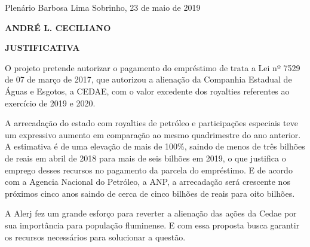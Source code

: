 \documentclass[10pt]{article}
\begin{document}
\begin{center}
  Plenário Barbosa Lima Sobrinho, 23 de maio de 2019

   \bigskip

  \textbf{ ANDRÉ L. CECILIANO}

  \bigskip

  \textbf{JUSTIFICATIVA}
  \bigskip

\end{center}

  O projeto pretende autorizar o pagamento do empréstimo de trata a Lei nº 7529 de 07 de março de 2017, que autorizou a alienação da Companhia Estadual de Águas e Esgotos, a CEDAE, com o valor excedente dos royalties referentes ao exercício de 2019 e 2020.
 
A arrecadação do estado com royalties de petróleo e participações especiais teve um expressivo aumento em comparação ao mesmo quadrimestre do ano anterior. A estimativa é de uma elevação de mais de 100\%, saindo de menos de três bilhões de reais em abril de 2018 para mais de seis bilhões em 2019, o que justifica o emprego desses recursos no pagamento da parcela do empréstimo. E de acordo com a Agencia Nacional do Petróleo, a ANP, a arrecadação será crescente nos próximos cinco anos saindo de cerca de cinco bilhões de reais para oito bilhões.
 
A Alerj fez um grande esforço para reverter a alienação das ações da Cedae por sua importância para população fluminense. E com essa proposta busca garantir os recursos necessários para solucionar a questão.



\iffalse
\begin{center}
  \textbf{REFERÊNCIAS}
\end{center}


\fi
\end{document}
